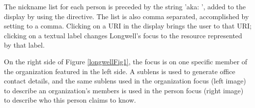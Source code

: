 The nickname list for each person is preceded by the string 'aka: ', added to the display by using the  directive.  The list is also comma separated, accomplished by setting  to a comma.  Clicking on a URI in the display brings the user to that URI; clicking on a textual label changes Longwell's focus to the resource represented by that label.

On the right side of Figure \ref{longwellFig1}, the focus is on one specific member of the organization featured in the left side.  A sublens is used to generate office contact details, and the same sublens used in the organization focus (left image) to describe an organization's members is used in the person focus (right image) to describe who this person claims to know.
